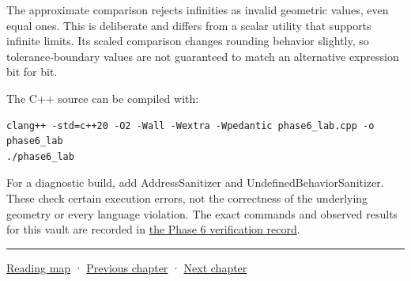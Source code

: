 The approximate comparison rejects infinities as invalid geometric values, even equal ones. This is deliberate and differs from a scalar utility that supports infinite limits. Its scaled comparison changes rounding behavior slightly, so tolerance-boundary values are not guaranteed to match an alternative expression bit for bit.

The C++ source can be compiled with:

\begin{verbatim}
clang++ -std=c++20 -O2 -Wall -Wextra -Wpedantic phase6_lab.cpp -o phase6_lab
./phase6_lab
\end{verbatim}

For a diagnostic build, add AddressSanitizer and UndefinedBehaviorSanitizer. These check certain execution errors, not the correctness of the underlying geometry or every language violation. The exact commands and observed results for this vault are recorded in \hyperref[appendix-a103e7846d21-phase-6---source-analysis-and-verification]{the Phase 6 verification record}.

\begin{center}\rule{0.5\linewidth}{0.5pt}\end{center}

\hyperref[volume-reading-map]{Reading map} · \hyperref[02-foundations-ii-ch036-exposure-physical-optics-and-depth-of-field]{Previous chapter} · \hyperref[02-foundations-ii-ch038-reconstruct-the-complete-geometry-pipeline]{Next chapter}
